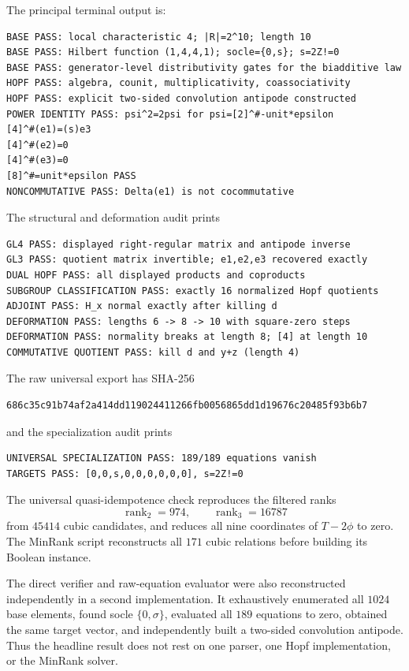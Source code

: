 \documentclass[11pt]{article}
\theoremstyle{remark}
\begin{document}
The principal terminal output is:
\begin{verbatim}
BASE PASS: local characteristic 4; |R|=2^10; length 10
BASE PASS: Hilbert function (1,4,4,1); socle={0,s}; s=2Z!=0
BASE PASS: generator-level distributivity gates for the biadditive law
HOPF PASS: algebra, counit, multiplicativity, coassociativity
HOPF PASS: explicit two-sided convolution antipode constructed
POWER IDENTITY PASS: psi^2=2psi for psi=[2]^#-unit*epsilon
[4]^#(e1)=(s)e3
[4]^#(e2)=0
[4]^#(e3)=0
[8]^#=unit*epsilon PASS
NONCOMMUTATIVE PASS: Delta(e1) is not cocommutative
\end{verbatim}
The structural and deformation audit prints
\begin{verbatim}
GL4 PASS: displayed right-regular matrix and antipode inverse
GL3 PASS: quotient matrix invertible; e1,e2,e3 recovered exactly
DUAL HOPF PASS: all displayed products and coproducts
SUBGROUP CLASSIFICATION PASS: exactly 16 normalized Hopf quotients
ADJOINT PASS: H_x normal exactly after killing d
DEFORMATION PASS: lengths 6 -> 8 -> 10 with square-zero steps
DEFORMATION PASS: normality breaks at length 8; [4] at length 10
COMMUTATIVE QUOTIENT PASS: kill d and y+z (length 4)
\end{verbatim}
The raw universal export has SHA-256
\begin{verbatim}
686c35c91b74af2a414dd119024411266fb0056865dd1d19676c20485f93b6b7
\end{verbatim}
and the specialization audit prints
\begin{verbatim}
UNIVERSAL SPECIALIZATION PASS: 189/189 equations vanish
TARGETS PASS: [0,0,s,0,0,0,0,0,0], s=2Z!=0
\end{verbatim}

The universal quasi-idempotence check reproduces the filtered ranks
\[
 \operatorname{rank}_2=974,\qquad
 \operatorname{rank}_3=16787
\]
from \(45414\) cubic candidates, and reduces all nine coordinates of
\(T-2\phi\) to zero.  The MinRank script reconstructs all \(171\) cubic
relations before building its Boolean instance.

The direct verifier and raw-equation evaluator were also reconstructed
independently in a second implementation.  It exhaustively enumerated all
\(1024\) base elements, found socle \(\{0,\sigma\}\), evaluated all \(189\)
equations to zero, obtained the same target vector, and independently built
a two-sided convolution antipode.  Thus the headline result does not rest on
one parser, one Hopf implementation, or the MinRank solver.
\end{document}
